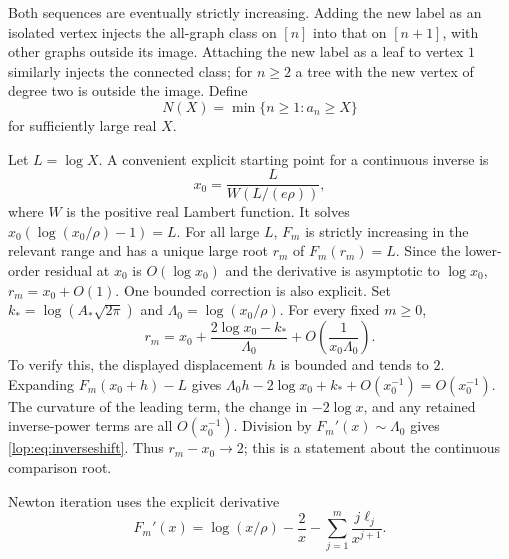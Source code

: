 \documentclass[11pt,letterpaper]{article}
\numberwithin{equation}{section}
\theoremstyle{remark}\newtheorem{remark}[theorem]{Remark}
\begin{document}
Both sequences are eventually strictly increasing. Adding the new label
as an isolated vertex injects the all-graph class on $[n]$ into that on
$[n+1]$, with other graphs outside its image. Attaching the new label as
a leaf to vertex $1$ similarly injects the connected class; for $n\geq2$
a tree with the new vertex of degree two is outside the image. Define
\[
 N(X)=\min\{n\geq1:a_n\geq X\}
\]
for sufficiently large real $X$.

Let $L=\log X$. A convenient explicit starting point for a continuous
inverse is
\begin{equation}\label{lop:eq:Lambert}
 x_0=\frac{L}{W(L/(e\rho))},
\end{equation}
where $W$ is the positive real Lambert function. It solves
$x_0(\log(x_0/\rho)-1)=L$. For all large $L$, $F_m$ is strictly
increasing in the relevant range and has a unique large root $r_m$ of
$F_m(r_m)=L$. Since the lower-order residual at $x_0$ is $O(\log x_0)$
and the derivative is asymptotic to $\log x_0$, $r_m=x_0+O(1)$.
One bounded correction is also explicit. Set
$k_*=\log(A_*\sqrt{2\pi})$ and $\Lambda_0=\log(x_0/\rho)$. For every
fixed $m\geq0$,
\begin{equation}\label{lop:eq:inverseshift}
 r_m=x_0+\frac{2\log x_0-k_*}{\Lambda_0}
           +O\!\left(\frac1{x_0\Lambda_0}\right).
\end{equation}
To verify this, the displayed displacement $h$ is bounded and tends to
$2$. Expanding $F_m(x_0+h)-L$ gives
$\Lambda_0h-2\log x_0+k_*+O(x_0^{-1})=O(x_0^{-1})$.
The curvature of the leading term, the change in $-2\log x$, and any
retained inverse-power terms are all $O(x_0^{-1})$. Division by
$F_m'(x)\sim\Lambda_0$ gives \eqref{lop:eq:inverseshift}. Thus $r_m-x_0\to2$;
this is a statement about the continuous comparison root.

Newton iteration uses the explicit derivative
\begin{equation}\label{lop:eq:Newton}
 F_m'(x)=\log(x/\rho)-\frac2x
             -\sum_{j=1}^m\frac{j\ell_j}{x^{j+1}}.
\end{equation}
\end{document}
